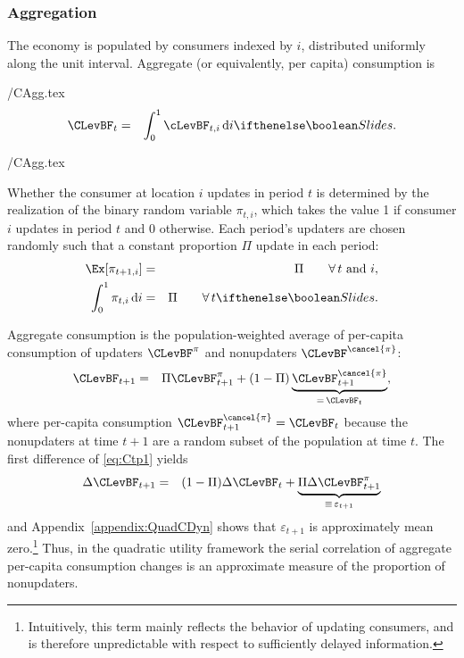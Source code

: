 \documentclass[titlepage]{\econtex}\newcommand{\texname}{cAndCwithStickyE}
\begin{document}
\subsubsection*{Aggregation}

The economy is populated by consumers indexed by $i$, distributed uniformly along the unit interval.  Aggregate (or equivalently, per capita) consumption is
\begin{verbatimwrite}{\eq/CAgg.tex}
\begin{eqnarray*}
        \CLevBF_{t} & = & \int_{0}^{1} \cLevBF_{t,i}\,\text{d}i
\ifslides{}{.}
\end{eqnarray*}
\end{verbatimwrite}
 \eq/CAgg.tex

Whether the consumer at location $i$ updates in period $t$ is determined by the realization of the binary random variable $\pi_{t,i}$, which takes the value 1 if consumer $i$ updates in period $t$ and 0 otherwise.  Each period's updaters are chosen randomly such that a constant proportion $\Pi$ update in each period:
\begin{eqnarray*}
   \Ex[\pi_{t+1,i}] &= & \Pi \qquad \forall\,t \text{ and } i,
\\ \int_{0}^{1} \pi_{t,i}\,\text{d}i & = & \Pi \qquad \forall\,t
\ifslides{}{.}
\end{eqnarray*}

Aggregate consumption is the population-weighted average of per-capita consumption of updaters $\CLevBF^{\pi}$ and nonupdaters $\CLevBF^{\cancel{\pi}}$:
\begin{eqnarray}
 \CLevBF_{t+1} & = & \Pi \CLevBF^{{\pi}}_{t+1}+(1-\Pi) \underbrace{\CLevBF^{\cancel{{\pi}}}_{t+1}}_{=\,\CLevBF_{t}}, \label{eq:Ctp1}
\end{eqnarray}
where per-capita consumption $\CLevBF^{\cancel{{\pi}}}_{t+1}=\CLevBF_{t}$ because the
nonupdaters at time $t+1$ are a random subset of the population at time $t$.
The first difference of \eqref{eq:Ctp1} yields
\begin{eqnarray*}
  \Delta \CLevBF_{t+1} & = &  (1-\Pi) \Delta \CLevBF_{t} + \underbrace{\Pi \Delta \CLevBF^{{\pi}}_{t+1}}_{\equiv\,\varepsilon_{t+1}} \label{eq:deltac} \label{eq:dCQuadStickyApprox}
\end{eqnarray*}
and Appendix~\ref{appendix:QuadCDyn} shows that $\varepsilon_{t+1}$ is approximately mean zero.\footnote{Intuitively, this term mainly reflects the behavior of updating consumers, and is therefore unpredictable with respect to sufficiently delayed information.}  Thus, in the quadratic utility framework the serial correlation of aggregate per-capita consumption changes is an approximate measure of the proportion of nonupdaters.
\end{document}
